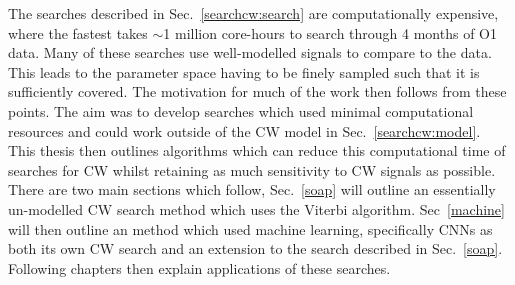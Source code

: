 The searches described in Sec.~\ref{searchcw:search} are computationally expensive, where the fastest takes $\sim$1 million core-hours to search through 4 months of O1 data.
Many of these searches use well-modelled signals to compare to the data. This leads to the parameter space having to be finely sampled such that it is sufficiently covered.  
The motivation for much of the work then follows from these points. 
The aim was to develop searches which used minimal computational resources and could work outside of the \gls{CW} model in Sec.~\ref{searchcw:model}.
This thesis then outlines algorithms which can reduce this computational time of searches for \gls{CW} whilst retaining as much sensitivity to \gls{CW} signals as possible.
There are two main sections which follow, Sec.~\ref{soap} will outline an essentially un-modelled \gls{CW} search method which uses the Viterbi algorithm.
Sec~\ref{machine} will then outline an method which used machine learning, specifically \glspl{CNN} as both its own \gls{CW} search and an extension to the search described in Sec.~\ref{soap}.
Following chapters then explain applications of these searches.


